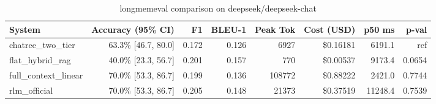 \begin{table}[t]
\centering
\small
\begin{tabular}{lrrrrrrr}
\toprule
\textbf{System} & \textbf{Accuracy (95\% CI)} & \textbf{F1} & \textbf{BLEU-1} & \textbf{Peak Tok} & \textbf{Cost (USD)} & \textbf{p50 ms} & \textbf{p-val} \\
\midrule
chatree\_two\_tier & 63.3\% [46.7, 80.0] & 0.172 & 0.126 & 6927 & \$0.16181 & 6191.1 & ref \\
flat\_hybrid\_rag & 40.0\% [23.3, 56.7] & 0.201 & 0.157 & 770 & \$0.00537 & 9173.4 & 0.0654 \\
full\_context\_linear & 70.0\% [53.3, 86.7] & 0.199 & 0.136 & 108772 & \$0.88222 & 2421.0 & 0.7744 \\
rlm\_official & 70.0\% [53.3, 86.7] & 0.205 & 0.148 & 21373 & \$0.37519 & 11248.4 & 0.7539 \\
\bottomrule
\end{tabular}
\caption{longmemeval comparison on deepseek/deepseek-chat}
\label{tab:longmemeval}
\end{table}
